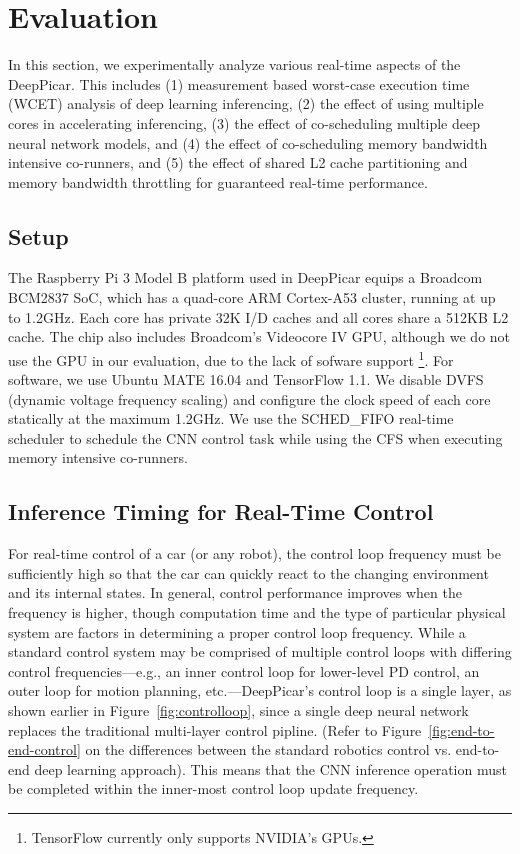 \section{Evaluation}\label{sec:evaluation}

In this section, we experimentally analyze various real-time aspects
of the DeepPicar. This includes
(1) measurement based worst-case execution time (WCET) analysis of
deep learning inferencing,
(2) the effect of using multiple cores in accelerating inferencing,
(3) the effect of co-scheduling multiple deep neural network models,
and
(4) the effect of co-scheduling memory bandwidth intensive co-runners,
and
(5) the effect of shared L2 cache partitioning and memory bandwidth
throttling for guaranteed real-time performance.

\subsection{Setup}
The Raspberry Pi 3 Model B platform used in DeepPicar equips a Broadcom
BCM2837 SoC, which has a quad-core ARM Cortex-A53 cluster,
running at up to 1.2GHz. Each core has private 32K I/D caches
and all cores share a 512KB L2 cache.
The chip also includes Broadcom's Videocore IV GPU, although we do
not use the GPU in our evaluation, due to the lack of sofware support
\footnote{TensorFlow currently only supports NVIDIA's GPUs.}.
For software, we use Ubuntu MATE 16.04 and TensorFlow 1.1.
We disable DVFS (dynamic voltage frequency scaling) and
configure the clock speed of each core statically at the maximum 1.2GHz.
We use the SCHED\_FIFO real-time scheduler to schedule the CNN control
task while using the CFS when executing memory intensive co-runners.

\subsection{Inference Timing for Real-Time Control}
For real-time control of a car (or any robot), the control loop
frequency must be sufficiently high so that the car can quickly
react to the changing environment and its internal states. In general,
control performance improves when the frequency is higher, though
computation time and the type of particular physical system are
factors in determining a proper control loop frequency. While a standard
control system may be comprised of multiple control loops with
differing control frequencies---e.g., an inner control loop for lower-level
PD control, an outer loop for motion planning, etc.---DeepPicar's
control loop is a single layer, as shown earlier in
Figure~\ref{fig:controlloop}, since a single deep neural network
replaces the traditional multi-layer control pipline. (Refer to
Figure~\ref{fig:end-to-end-control} on the differences between the
standard robotics control vs. end-to-end deep learning approach).
This means that the CNN inference operation must be completed
within the inner-most control loop update frequency.

